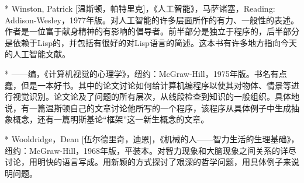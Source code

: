 \begin{thebib}
\begin{biblist}
\item[*] Winston, Patrick [温斯顿，帕特里克]，《人工智能》，马萨诸塞，Reading: Addison-Wesley，1977年版。对人工智能的许多层面所作的有力、一般性的表述。作者是一位富于献身精神的有影响的倡导者。前半部分是独立于程序的，后半部分是依赖于Lisp的，并包括有很好的对Lisp语言的简述。这本书有许多地方指向今天的人工智能文献。

\item[*]——编，《计算机视觉的心理学》，纽约：McGraw-Hill，1975年版。书名有点蠢，但是一本好书。其中的论文讨论如何给计算机编程序以使其对物体、情景等进行视觉识别。论文论及了问题的所有层次，从线段检查到知识的一般组织。具体地说，有一篇温斯顿自己的文章讨论他所写的一个程序，该程序从具体例子中生成抽象概念，还有一篇明斯基论“框架”这一新生概念的文章。

\item[*] Wooldridge，Dean [伍尔德里奇，迪恩]，《机械的人——智力生活的生理基础》，纽约：McGraw-Hill，1968年版，平装本。对智力现象和大脑现象之间关系的详尽讨论，用明快的语言写成。用新颖的方式探讨了艰深的哲学问题，用具体例子来说明问题。

\end{biblist}

\end{thebib}
